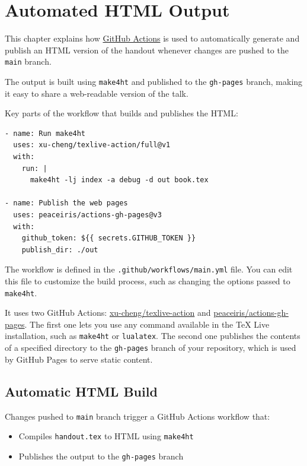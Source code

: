 \documentclass{book}
\begin{document}
\chapter{Automated HTML Output}

This chapter explains how \href{https://docs.github.com/en/actions/writing-workflows/quickstart}{GitHub Actions}
is used to automatically generate and publish an HTML version of the handout whenever changes are pushed to the \texttt{main} branch.

The output is built using \texttt{make4ht} and published to the \texttt{gh-pages} branch,
making it easy to share a web-readable version of the talk.

Key parts of the workflow that builds and publishes the HTML:

\begin{verbatim}
- name: Run make4ht
  uses: xu-cheng/texlive-action/full@v1
  with:
    run: |
      make4ht -lj index -a debug -d out book.tex

- name: Publish the web pages
  uses: peaceiris/actions-gh-pages@v3
  with:
    github_token: ${{ secrets.GITHUB_TOKEN }}
    publish_dir: ./out
\end{verbatim}



The workflow is defined in the \texttt{.github/workflows/main.yml} file.
You can edit this file to customize the build process, such as changing the options passed to \texttt{make4ht}.

It uses two GitHub Actions: \href{https://github.com/xu-cheng/texlive-action}{xu-cheng/texlive-action}
and \href{https://github.com/peaceiris/actions-gh-pages}{peaceiris/actions-gh-pages}.
The first one lets you use any command available in the TeX Live installation, such as \texttt{make4ht} or \texttt{lualatex}.
The second one publishes the contents of a specified directory to the \texttt{gh-pages} branch of your repository,
which is used by GitHub Pages to serve static content.



\section{Automatic HTML Build}
Changes pushed to \texttt{main} branch trigger a GitHub Actions workflow that:

\begin{itemize}
  \item Compiles \texttt{handout.tex} to HTML using \texttt{make4ht}
  \item Publishes the output to the \texttt{gh-pages} branch
\end{itemize}
\end{document}

